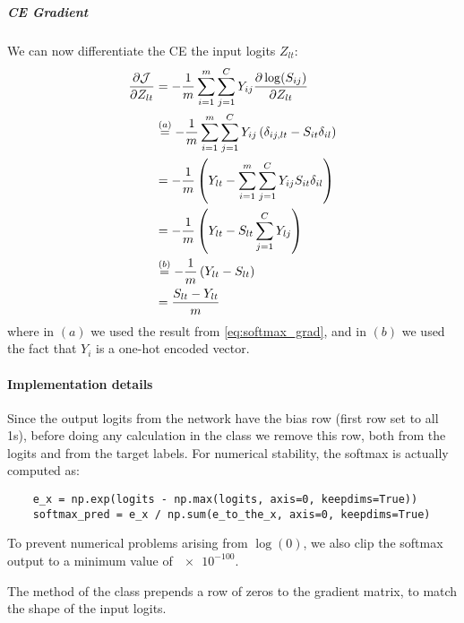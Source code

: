 \subparagraph{\ac{CE} Gradient} We can now differentiate the \ac{CE} \wrt the input logits $Z_{lt}$:
\begin{equation}
\begin{split}
    \pdv{\mathcal{J}}{Z_{lt}} &= -\frac{1}{m} \sum_{i=1}^{m} \sum_{j=1}^{C} Y_{ij} \pdv{\log(S_{ij})}{Z_{lt}}\\
    &\overset{(a)}{=} -\frac{1}{m} \sum_{i=1}^{m} \sum_{j=1}^{C} Y_{ij} \left(\delta_{ij,lt} - S_{it} \delta_{il} \right)\\
    &= -\frac{1}{m} \left( Y_{lt} - \sum_{i=1}^{m} \sum_{j=1}^{C} Y_{ij} S_{it} \delta_{il} \right)\\
    &= -\frac{1}{m} \left( Y_{lt} - S_{lt} \sum_{j=1}^{C} Y_{lj} \right)\\
    &\overset{(b)}{=} -\frac{1}{m} \left( Y_{lt} - S_{lt} \right)\\
    &= \frac{S_{lt} - Y_{lt}}{m}
\end{split}
\end{equation}
where in $(a)$ we used the result from \cref{eq:softmax_grad}, and in $(b)$ we used the fact that $Y_i$ is a one-hot encoded vector.

\paragraph{Implementation details} Since the output logits from the network have the bias row (first row set to all 1s), before doing any calculation in the  class we remove this row, both from the logits and from the target labels. For numerical stability, the softmax is actually computed as:
\begin{verbatim}
    e_x = np.exp(logits - np.max(logits, axis=0, keepdims=True))
    softmax_pred = e_x / np.sum(e_to_the_x, axis=0, keepdims=True)
\end{verbatim}

To prevent numerical problems arising from $\log(0)$, we also clip the softmax output to a minimum value of $\num{e-100}$.

The  method of the  class prepends a row of zeros to the gradient matrix, to match the shape of the input logits.
